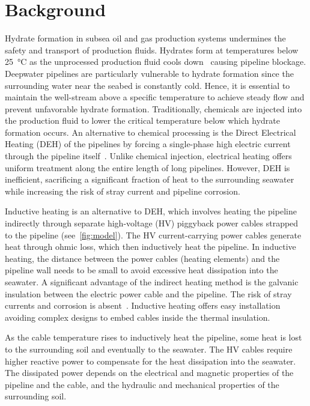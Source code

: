 \documentclass[Journal,letterpaper,InsideFigs]{ascelike-new}
\begin{document}
\section{Background}
Hydrate formation in subsea oil and gas production systems undermines the safety and transport of production fluids. Hydrates form at temperatures below \SI{25}{\celsius} as the unprocessed production fluid cools down~\cite{nazeri2014evaluation,daraboina2015natural} causing pipeline blockage. Deepwater pipelines are particularly vulnerable to hydrate formation since the surrounding water near the seabed is constantly cold. Hence, it is essential to maintain the well-stream above a specific temperature to achieve steady flow and prevent unfavorable hydrate formation. Traditionally, chemicals are injected into the production fluid to lower the critical temperature below which hydrate formation occurs. An alternative to chemical processing is the Direct Electrical Heating (DEH) of the pipelines by forcing a single-phase high electric current through the pipeline itself~\cite{nysveen2005direct}. Unlike chemical injection, electrical heating offers uniform treatment along the entire length of long pipelines. However, DEH is inefficient, sacrificing a  significant fraction of heat to the surrounding seawater while increasing the risk of stray current and pipeline corrosion. 


Inductive heating is an alternative to DEH, which involves heating the pipeline indirectly through separate high-voltage (HV) piggyback power cables strapped to the pipeline (see~\cref{fig:model}). The HV current-carrying power cables generate heat through ohmic loss, which then inductively heat the pipeline. In inductive heating, the distance between the power cables (heating elements) and the pipeline wall needs to be small to avoid excessive heat dissipation into the seawater. A significant advantage of the indirect heating method is the galvanic insulation between the electric power cable and the pipeline. The risk of stray currents and corrosion is absent~\cite{nysveen2005direct}. Inductive heating offers easy installation avoiding complex designs to embed cables inside the thermal insulation. 

As the cable temperature rises to inductively heat the pipeline, some heat is lost to the surrounding soil and eventually to the seawater. The HV cables require higher reactive power to compensate for the heat dissipation into the seawater. The dissipated power depends on the electrical and magnetic properties of the pipeline and the cable, and the hydraulic and mechanical properties of the surrounding soil.
\end{document}
